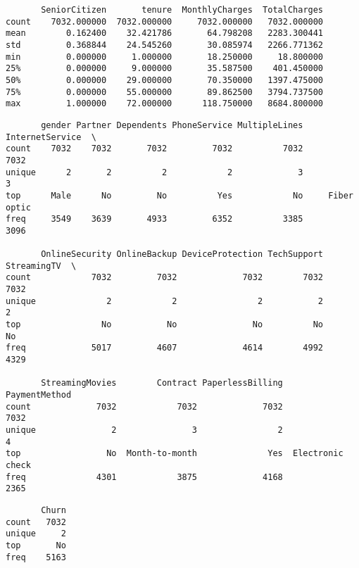 \documentclass[11pt]{article}
\begin{document}
    
    \begin{verbatim}
       SeniorCitizen       tenure  MonthlyCharges  TotalCharges
count    7032.000000  7032.000000     7032.000000   7032.000000
mean        0.162400    32.421786       64.798208   2283.300441
std         0.368844    24.545260       30.085974   2266.771362
min         0.000000     1.000000       18.250000     18.800000
25%         0.000000     9.000000       35.587500    401.450000
50%         0.000000    29.000000       70.350000   1397.475000
75%         0.000000    55.000000       89.862500   3794.737500
max         1.000000    72.000000      118.750000   8684.800000
    \end{verbatim}

    
    
    \begin{verbatim}
       gender Partner Dependents PhoneService MultipleLines InternetService  \
count    7032    7032       7032         7032          7032            7032   
unique      2       2          2            2             3               3   
top      Male      No         No          Yes            No     Fiber optic   
freq     3549    3639       4933         6352          3385            3096   

       OnlineSecurity OnlineBackup DeviceProtection TechSupport StreamingTV  \
count            7032         7032             7032        7032        7032   
unique              2            2                2           2           2   
top                No           No               No          No          No   
freq             5017         4607             4614        4992        4329   

       StreamingMovies        Contract PaperlessBilling     PaymentMethod  
count             7032            7032             7032              7032  
unique               2               3                2                 4  
top                 No  Month-to-month              Yes  Electronic check  
freq              4301            3875             4168              2365  
    \end{verbatim}

    
    
    \begin{verbatim}
       Churn
count   7032
unique     2
top       No
freq    5163
    \end{verbatim}
\end{document}
